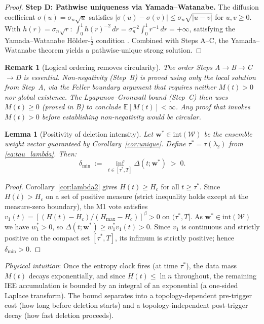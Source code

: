 \documentclass[review,12pt]{elsarticle}
\newcommand{\bfw}{\mathbf{w}}
\newcommand{\Hc}{H_c}
\newcommand{\Hmax}{H_{\max}}
\newcommand{\lambdat}{\lambda_2}
\newtheorem{lemma}{Lemma}
\newtheorem{remark}{Remark}
\begin{document}
\begin{proof}
\medskip
\noindent\textbf{Step D: Pathwise uniqueness via Yamada--Watanabe.}
The diffusion coefficient $\sigma(u) = \sigma_n\sqrt{u}$ satisfies
$|\sigma(u) - \sigma(v)| \leq \sigma_n\sqrt{|u-v|}$ for $u,v \geq 0$.
With $h(r) = \sigma_n\sqrt{r}$: $\int_0^1 h(r)^{-2}\,dr
= \sigma_n^{-2}\int_0^1 r^{-1}\,dr = +\infty$,
satisfying the Yamada--Watanabe H\"older-$\tfrac{1}{2}$ condition
\cite[Thm.~IX.3.5]{revuzyor1999}.
Combined with Steps A--C, the Yamada--Watanabe theorem yields a
pathwise-unique strong solution.
\end{proof}

\begin{remark}[Logical ordering removes circularity]
\label{rem:thm1_ordering}
The order Steps A$\to$B$\to$C$\to$D is essential. Non-negativity (Step~B) is
proved using only the local solution from Step~A, via the Feller boundary
argument that requires neither $M(t)>0$ nor global existence. The
Lyapunov--Gronwall bound (Step~C) then \emph{uses} $M(t)\geq 0$ (proved in B)
to conclude $\mathbb{E}[M(t)] < \infty$. Any proof that invokes $M(t) > 0$
before establishing non-negativity would be circular.
\end{remark}

\begin{lemma}[Positivity of deletion intensity]
\label{lem:delta_pos}
Let $\bfw^* \in \mathrm{int}(\mathcal{W})$ be the ensemble weight vector
guaranteed by Corollary~\ref{cor:unique}.  Define
$\tau^* = \tau(\lambdat)$ from \eqref{eq:tau_lambda}.  Then:
\begin{equation}
  \delta_{\min} \;:=\; \inf_{t \in [\tau^*, T]} \Delta(t;\bfw^*) \;>\; 0.
  \label{eq:delta_min}
\end{equation}
\end{lemma}

\begin{proof}
Corollary~\ref{cor:lambda2} gives $H(t) \geq \Hc$ for all $t \geq \tau^*$.
Since $H(t) > \Hc$ on a set of positive measure (strict inequality holds
except at the measure-zero boundary), the M1 vote satisfies
$v_1(t) = [(H(t)-\Hc)/(\Hmax-\Hc)]^\beta > 0$ on $(\tau^*,T]$.
As $\bfw^* \in \mathrm{int}(\mathcal{W})$ we have $w_1^* > 0$, so
$\Delta(t;\bfw^*) \geq w_1^* v_1(t) > 0$.
Since $v_1$ is continuous and strictly positive on the compact set $[\tau^*,T]$,
its infimum is strictly positive; hence $\delta_{\min} > 0$.
\end{proof}

\noindent\emph{Physical intuition}: Once the entropy clock fires (at time $\tau^*$),
the data mass $M(t)$ decays exponentially, and since $H(t) \leq \ln n$
throughout, the remaining IEE accumulation is bounded by an integral of
an exponential (a one-sided Laplace transform).  The bound separates into
a topology-dependent pre-trigger cost (how long before deletion starts)
and a topology-independent post-trigger decay (how fast deletion proceeds).
\end{document}

